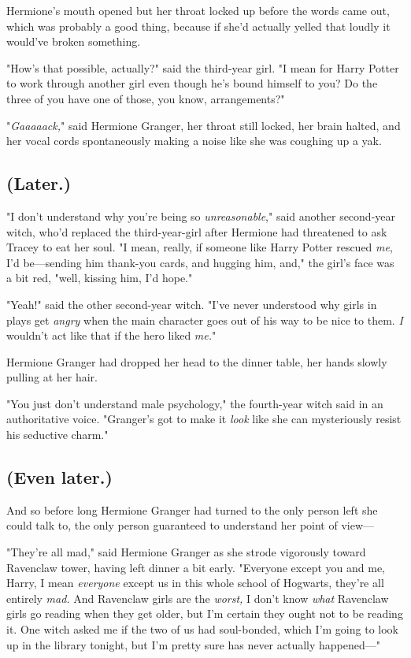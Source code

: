 Hermione's mouth opened but her throat locked up before the words came out,
which was probably a good thing, because if she'd actually yelled that loudly
it would've broken something.

"How's that possible, actually?" said the third-year girl. "I mean for Harry
Potter to work through another girl even though he's bound himself to you? Do
the three of you have one of those, you know, arrangements?"

"\emph{Gaaaaack,}" said Hermione Granger, her throat still locked, her brain
halted, and her vocal cords spontaneously making a noise like she was coughing
up a yak.
\sbreak
\subsection{(Later.)}

"I don't understand why you're being so \emph{unreasonable}," said another
second-year witch, who'd replaced the third-year-girl after Hermione had
threatened to ask Tracey to eat her soul. "I mean, really, if someone like
Harry Potter rescued \emph{me}, I'd be---sending him thank-you cards, and
hugging him, and," the girl's face was a bit red, "well, kissing him, I'd hope."

"Yeah!" said the other second-year witch. "I've never understood why girls in
plays get \emph{angry} when the main character goes out of his way to be nice
to them. \emph{I} wouldn't act like that if the hero liked \emph{me.}"

Hermione Granger had dropped her head to the dinner table, her hands slowly
pulling at her hair.

"You just don't understand male psychology," the fourth-year witch said in an
authoritative voice. "Granger's got to make it \emph{look} like she can
mysteriously resist his seductive charm."
\sbreak
\subsection{(Even later.)}

And so before long Hermione Granger had turned to the only person left she
could talk to, the only person guaranteed to understand her point of view---

"They're all mad," said Hermione Granger as she strode vigorously toward
Ravenclaw tower, having left dinner a bit early. "Everyone except you and me,
Harry, I mean \emph{everyone} except us in this whole school of Hogwarts,
they're all entirely \emph{mad.} And Ravenclaw girls are the \emph{worst,} I
don't know \emph{what} Ravenclaw girls go reading when they get older, but I'm
certain they ought not to be reading it. One witch asked me if the two of us
had soul-bonded, which I'm going to look up in the library tonight, but I'm
pretty sure has never actually happened\mbox{---}"

